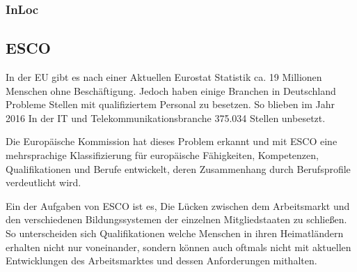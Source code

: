 \vspace{1em}

\subsubsection{InLoc}\label{inloc}
\subsection{ESCO}

In der EU gibt es nach einer Aktuellen Eurostat Statistik ca. 19 Millionen Menschen ohne Beschäftigung. Jedoch haben einige Branchen in Deutschland Probleme Stellen mit qualifiziertem Personal zu besetzen. So blieben im Jahr 2016 In der IT und Telekommunikationsbranche 375.034 Stellen unbesetzt. 
 
Die Europäische Kommission hat dieses Problem erkannt und mit ESCO eine mehrsprachige Klassifizierung für europäische Fähigkeiten, Kompetenzen, Qualifikationen und Berufe entwickelt, deren Zusammenhang durch Berufsprofile verdeutlicht wird.
 
Ein der Aufgaben von ESCO ist es, Die Lücken zwischen dem Arbeitsmarkt und den verschiedenen Bildungssystemen der einzelnen Mitgliedstaaten zu schließen. So unterscheiden sich Qualifikationen welche Menschen in ihren Heimatländern erhalten nicht nur voneinander, sondern können auch oftmals nicht mit aktuellen Entwicklungen des Arbeitsmarktes und dessen Anforderungen mithalten.
